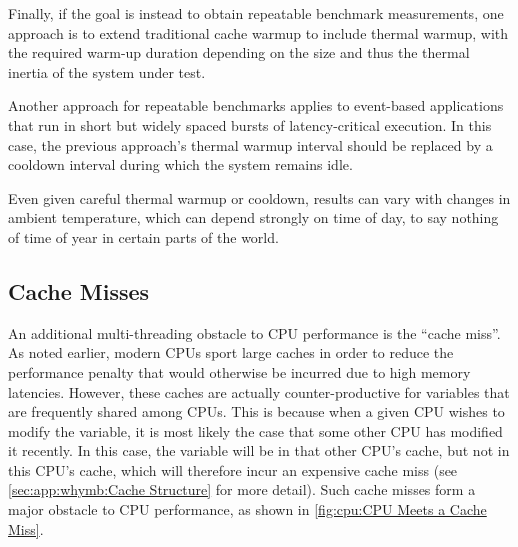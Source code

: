 Finally, if the goal is instead to obtain repeatable benchmark
measurements, one approach is to extend traditional cache warmup to
include thermal warmup, with the required warm-up duration depending on
the size and thus the thermal inertia of the system under test.

Another approach for repeatable benchmarks applies to event-based
applications that run in short but widely spaced bursts of
latency-critical execution.
In this case, the previous approach's thermal warmup interval should be
replaced by a cooldown interval during which the system remains idle.

Even given careful thermal warmup or cooldown, results can vary with
changes in ambient temperature, which can depend strongly on time of day,
to say nothing of time of year in certain parts of the world.

\QuickQuizEnd

\subsection{Cache Misses}
\label{sec:cpu:Cache Misses}

An additional multi-threading obstacle to CPU performance is
the ``cache miss''.
As noted earlier, modern CPUs sport large caches in order to reduce the
performance penalty that would otherwise be incurred due to high memory
latencies.
However, these caches are actually counter-productive for variables that
are frequently shared among CPUs.
This is because when a given CPU wishes to modify the variable, it is
most likely the case that some other CPU has modified it recently.
In this case, the variable will be in that other CPU's cache, but not
in this CPU's cache, which will therefore incur an expensive cache miss
(see \cref{sec:app:whymb:Cache Structure} for more detail).
Such cache misses form a major obstacle to CPU performance, as shown
in \cref{fig:cpu:CPU Meets a Cache Miss}.


